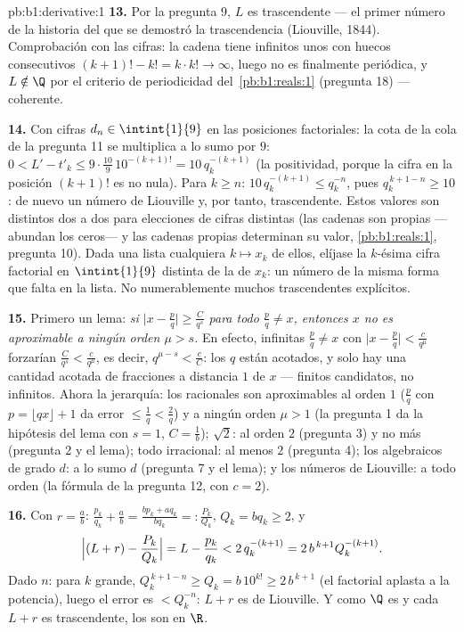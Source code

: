 \begin{solution}{pb:b1:derivative:1}
\textbf{13.} Por la pregunta 9, $L$ es trascendente --- el primer
número de la historia del que se demostró la trascendencia
(Liouville, 1844). Comprobación con las cifras: la cadena tiene
infinitos unos con huecos consecutivos
$(k+1)! - k! = k\cdot k! \to \infty$, luego no es finalmente
periódica, y $L \notin \Q$ por el criterio de periodicidad
del~\cref{pb:b1:reals:1} (pregunta 18) --- coherente.

\textbf{14.} Con cifras $d_n \in \intint{1}{9}$ en las posiciones
factoriales: la cota de la cola de la pregunta 11 se multiplica a lo
sumo por $9$: $0 < L' - t'_k \leq
9\cdot\frac{10}{9}\,10^{-(k+1)!} = 10\,q_k^{-(k+1)}$ (la positividad,
porque la cifra en la posición $(k+1)!$ es no nula). Para $k \geq n$:
$10\,q_k^{-(k+1)} \leq q_k^{-n}$, pues $q_k^{\,k+1-n} \geq 10$: de
nuevo un número de Liouville y, por tanto, trascendente. Estos
valores son distintos dos a dos para elecciones de cifras distintas
(las cadenas son propias ---abundan los ceros--- y las cadenas
propias determinan su valor, \cref{pb:b1:reals:1}, pregunta 10). Dada
una lista cualquiera $k \mapsto x_k$ de ellos, elíjase la $k$-ésima
cifra factorial en $\intint{1}{9}$ distinta de la de $x_k$: un número
de la misma forma que falta en la lista. No numerablemente muchos
trascendentes explícitos.

\textbf{15.} Primero un lema: \emph{si
$\bigl|x - \frac pq\bigr| \geq \frac{C}{q^s}$ para todo
$\frac pq \neq x$, entonces $x$ no es aproximable a ningún orden
$\mu > s$.} En efecto, infinitas $\frac pq \neq x$ con
$\bigl|x - \frac pq\bigr| < \frac{c}{q^\mu}$ forzarían
$\frac{C}{q^s} < \frac{c}{q^\mu}$, es decir,
$q^{\mu - s} < \frac cC$: los $q$ están acotados, y solo hay una
cantidad acotada de fracciones a distancia $1$ de $x$ --- finitos
candidatos, no infinitos. Ahora la jerarquía: los racionales son
aproximables al orden $1$ ($\frac pq$ con
$p = \lfloor qx\rfloor + 1$ da error $\leq \frac1q < \frac2q$) y a
ningún orden $\mu > 1$ (la pregunta 1 da la hipótesis del lema con
$s = 1$, $C = \frac1b$); $\sqrt2$: al orden $2$ (pregunta 3) y no
más (pregunta 2 y el lema); todo irracional: al menos $2$
(pregunta 4); los algebraicos de grado $d$: a lo sumo $d$
(pregunta 7 y el lema); y los números de Liouville: a todo orden (la
fórmula de la pregunta 12, con $c = 2$).

\textbf{16.} Con $r = \frac ab$:
$\frac{p_k}{q_k} + \frac ab = \frac{b p_k + a q_k}{b q_k} =:
\frac{P_k}{Q_k}$, $Q_k = b q_k \geq 2$, y
\[
\Bigl|(L + r) - \frac{P_k}{Q_k}\Bigr| = L - \frac{p_k}{q_k}
< 2\,q_k^{-(k+1)} = 2\,b^{\,k+1} Q_k^{-(k+1)} .
\]
Dado $n$: para $k$ grande,
$Q_k^{\,k+1-n} \geq Q_k = b\,10^{k!} \geq 2\,b^{\,k+1}$ (el factorial
aplasta a la potencia), luego el error es $< Q_k^{-n}$: $L + r$ es de
Liouville. Y como $\Q$ es  y cada $L + r$ es trascendente, los
 son  en $\R$.


\end{solution}
